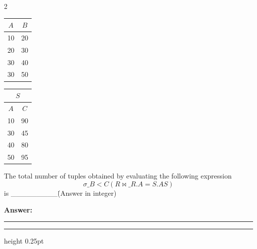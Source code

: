 \documentclass[a4paper,10pt,twoside]{article}
\begin{document}
\begin{multicols}{2}
{\begin{center}
\begin{tabular}{|c|c|}
\hline
$A$ & $B$ \\
\hline
10 & 20 \\
20 & 30 \\
30 & 40 \\
30 & 50 \\
\hline
\end{tabular}
\qquad
\begin{tabular}{|c|c|}
\multicolumn{2}{c}{$S$} \\
\hline
$A$ & $C$ \\
\hline
10 & 90 \\
30 & 45 \\
40 & 80 \\
50 & 95 \\
\hline
\end{tabular}
\end{center}
The total number of tuples obtained by evaluating the following expression
\[ \sigma\_{B < C}(R \bowtie\_{R.A = S.A} S) \]
is \_\_\_\_\_\_\_\_\_\. (Answer in integer) \par}
\par\vspace{3pt}\noindent\textbf{Answer:} \rule{3.2cm}{0.4pt}
\par\vspace{6pt}\hrule height 0.25pt\vspace{6pt}

\vspace{6pt}
\vspace{3pt}


\end{multicols}
\end{document}
